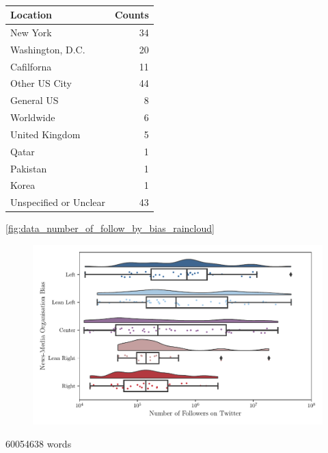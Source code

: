 \begin{table}
	\begin{tabular}{lr}
		\toprule
		Location &  Counts \\
		\midrule
		New York &      34 \\
		Washington, D.C. &      20 \\
		Cafilforna &      11 \\
		Other US City &      44 \\
		General US &       8 \\
		Worldwide &       6 \\
		United Kingdom &       5 \\
		Qatar &       1 \\
		Pakistan &       1 \\
		Korea  &       1 \\
		Unspecified or Unclear &      43 \\
		\bottomrule
	\end{tabular}
	\caption{\todo{}}
	\label{tab:data_locations}
\end{table}


\autoref{fig:data_number_of_follow_by_bias_raincloud}

\begin{figure}
	\centering
	\includegraphics{chapter1/figs/number_of_follow_by_bias_raincloud}
	\caption{\todo{}}
	\label{fig:data_number_of_follow_by_bias_raincloud}
\end{figure}


\the\textwidth

60054638 words
